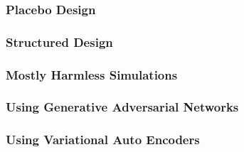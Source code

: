 \documentclass{beamer}
\begin{document}
\begin{frame}
	\frametitle{Placebo Design}
\end{frame}

\begin{frame}
	\frametitle{Structured Design}
\end{frame}

\begin{frame}
	\frametitle{Mostly Harmless Simulations}
\end{frame}

\begin{frame}
	\frametitle{Using Generative Adversarial Networks}
\end{frame}

\begin{frame}
	\frametitle{Using Variational Auto Encoders}
\end{frame}
\end{document}
